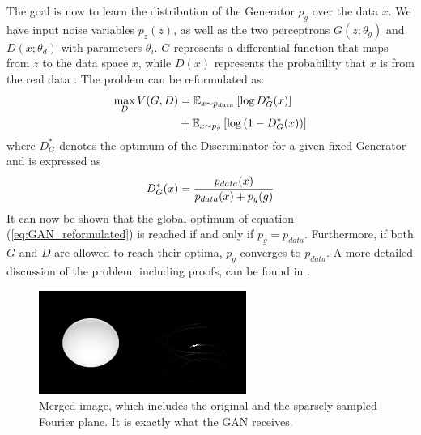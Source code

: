 The goal is now to learn the distribution of the Generator $p_g$ over the data $x$. We have input noise variables $p_z(z)$, as well as the two perceptrons $G(z; \theta_g)$ and $D(x; \theta_d)$ with parameters $\theta_i$. $G$ represents a differential function that maps from $z$ to the data space $x$, while $D(x)$ represents the probability that $x$ is from the real data \cite{goodfellow2014generative}. The problem can be reformulated as: 
\begin{equation}
	\centering
	\begin{aligned}
		\max_{D} V(G, D) &= \mathbb{E}_{x \sim p_{data}} \left[ \log D^{*}_{G}(x) \right] \\ 
		&+ \mathbb{E}_{x \sim p_{g}} \left[ \log \left( 1 - D^{*}_{G}(x) \right) \right]
	\end{aligned}
	\label{eq:GAN_reformulated}
\end{equation}
where $D^{*}_{G}$ denotes the optimum of the Discriminator for a given fixed Generator and is expressed as
\begin{equation}
	\centering
	D^*_G(x) = \frac{p_{data}(x)}{p_{data}(x) + p_g(g)}
	\label{eq:Disc_optimum}
\end{equation}
It can now be shown that the global optimum of equation (\ref{eq:GAN_reformulated}) is reached if and only if $p_g = p_{data}$. Furthermore, if both $G$ and $D$ are allowed to reach their optima, $p_g$ converges to $p_{data}$. A more detailed discussion of the problem, including proofs, can be found in \cite{goodfellow2014generative}.
\begin{figure}
	\centering
	\includegraphics[width=\linewidth]{fig/ellipsoid_0.jpg}
	\caption{Merged image, which includes the original and the sparsely sampled Fourier plane. It is exactly what the GAN receives. }
	\label{fig:GANinput}
\end{figure}
